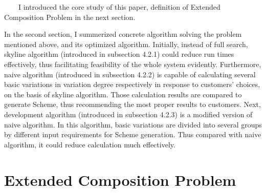 \documentclass[senior,final,11pt]{iscs-thesis}
\begin{document}
~~~~I introduced the core study of this paper, definition of Extended Composition Problem in the next section. 

In the second section, I summerized concrete algorithm solving the problem mentioned above, and its optimized algorithm. Initially, instead of full search, skyline algorithm (introduced in subsection 4.2.1) could reduce run times effectively, thus facilitating feasibility of the whole system evidently. Furthermore, naive algorithm (introduced in subsection 4.2.2) is capable of calculating several basic variations in variation degree respectively in response to customers' choices, on the basis of skyline algorithm. Those calculation results are compared to generate Scheme, thus recommending the most proper results to customers. Next, development algorithm (introduced in subsection 4.2.3) is a modified version of naive algorithm. In this algorithm, basic variations are divided into several groups by different input requirements for Scheme generation. Thus compared with naive algorithm, it could reduce calculation much effectively. 

\section{Extended Composition Problem} %
\end{document}
